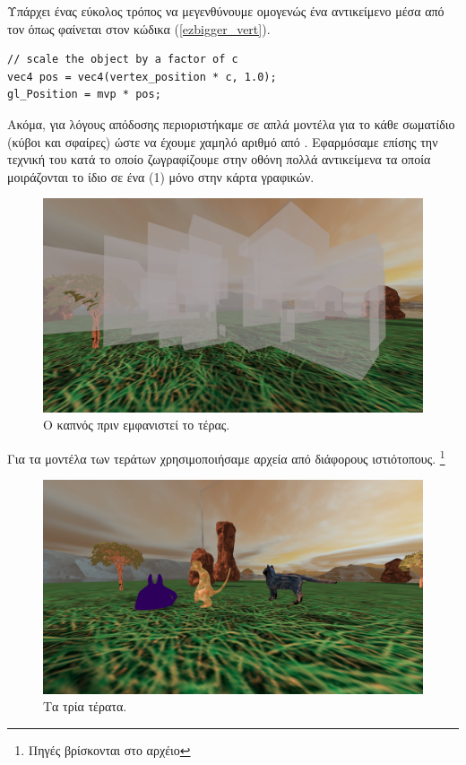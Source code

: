 \documentclass[11pt]{scrartcl} %
\newenvironment{centerimg}[1]%
{%
    \begin{figure}[H]
        #1
    \begin{center}
}%
{%
    \end{center}
    \end{figure}
}
\begin{document}
Υπάρχει ένας εύκολος τρόπος να μεγενθύνουμε ομογενώς ένα αντικείμενο μέσα από τον  όπως φαίνεται 
στον κώδικα (\ref{ezbigger_vert}).

\begin{minipage}{\textwidth}
\begin{lstlisting}[caption=\textgreek{Μεγέθυνση αντικειμένου από τον} vertex shader, label=ezbigger_vert]
// scale the object by a factor of c
vec4 pos = vec4(vertex_position * c, 1.0);
gl_Position = mvp * pos;
\end{lstlisting}
\end{minipage}

Ακόμα, για λόγους απόδοσης περιοριστήκαμε σε απλά μοντέλα για το κάθε σωματίδιο (κύβοι και σφαίρες) 
ώστε να έχουμε χαμηλό αριθμό από . Εφαρμόσαμε επίσης την τεχνική του 
κατά το οποίο ζωγραφίζουμε στην οθόνη πολλά αντικείμενα τα οποία μοιράζονται το ίδιο 
σε ένα (1) μόνο   στην κάρτα γραφικών.

\begin{centerimg}{\caption{Ο καπνός πριν εμφανιστεί το τέρας.}}
    \includegraphics[width=.7\textwidth]{./assets/smoke.png}
\end{centerimg}

 
Για τα μοντέλα των τεράτων χρησιμοποιήσαμε αρχεία  από διάφορους ιστιότοπους. 
\footnote{Πηγές βρίσκονται στο αρχέιο }


\begin{centerimg}{\caption{Τα τρία τέρατα.}}
    \includegraphics[width=.7\textwidth]{./assets/monsters.png}
\end{centerimg}
\end{document}
